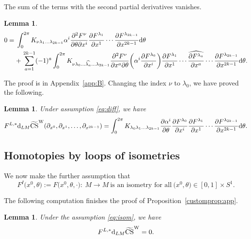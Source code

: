 \documentclass[10pt,a4paper]{amsart}
\numberwithin{equation}{section}
\newtheorem{Lemma}[Theorem]{Lemma}
\theoremstyle{definition}
\newcommand{\bm}{ M}
\newcommand{\ocs}{\widetilde{{\rm CS}}}
\begin{document}
The sum of the terms with the second partial derivatives vanishes.
\begin{Lemma}\label{lem:2.3a}
\begin{align*}%
 0={}& \int_0^{2\pi} K_{\nu \lambda_1\dots\lambda_{2k-1}}
 \alpha^i\frac{\partial^2 F^\nu}{\partial\theta \partial x^i}
\frac{\partial F^{\lambda_1}}{\partial x^1}
\cdots
\frac{\partial F^{\lambda_{2k-1}}}{\partial x^{2k-1}}
 {\rm d}\theta\nonumber \\
&{+}\, \sum_{a=1}^{2k-1}
(-1)^a
\int_0^{2\pi}
K_{\nu \lambda_0 \dots \widehat{\lambda_a} \dots \lambda_{2k-1}}
\frac{\partial^2 F^\nu}{\partial x^a \partial \theta} \biggl( \alpha^i\frac{\partial F^{\lambda_0}}{\partial x^i}
\biggr) \frac{\partial F^{\lambda_1}}{\partial x^1}
\cdots
\widehat{\frac{\partial F^{\lambda_a}}{\partial x^a}}
\cdots
\frac{\partial F^{\lambda_{2k-1}}}{\partial x^{2k-1}}
 {\rm d}\theta.\nonumber
 \end{align*}
 \end{Lemma}

 The proof is in Appendix~\ref{app:B}.
 Changing the index $\nu$ to $\lambda_0$, we have proved the following.
 \begin{Lemma}\label{lem:2.2}
 Under assumption \eqref{eq:diff}, we have
 \begin{equation*}%
 F^{L,*} {\rm d}_{L{\bm}} \ocs^{\rm W} (\partial_{x^0}, \partial_{x^1},\dots, \partial_{x^{2k-1}}) =
 \int_0^{2\pi} K_{\lambda_0 \lambda_1\dots\lambda_{2k-1}}
\frac{\partial \alpha^i}{\partial\theta} \frac{\partial F^{\lambda_0}}{\partial x^i}
\frac{\partial F^{\lambda_1}}{\partial x^1}
\cdots
\frac{\partial F^{\lambda_{2k-1}}}{\partial x^{2k-1}}
 {\rm d}\theta.
 \end{equation*}
 \end{Lemma}

 \subsection{Homotopies by loops of isometries}%
We now make the further assumption that
\begin{equation}\label{eq:isom}
 F^I\bigl(x^0,\theta\bigr) := F\bigl(x^0, \theta,\cdot\bigr)\colon\ \bm\to\bm \ \text{is an isometry for all} \ \bigl(x^0,\theta\bigr)\in [0,1]\times S^1.
\end{equation}

The following computation finishes the proof of Proposition~\ref{customprop:app}.
\begin{Lemma}\label{lem:2.3}
 Under the assumption \eqref{eq:isom}, we have
 \[F^{L,*} {\rm d}_{L{\bm}} \ocs^{\rm W}=0.\]
\end{Lemma}
\end{document}
